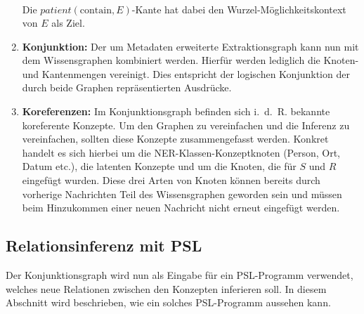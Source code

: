 \begin{enumerate}
\begin{align*}
		\end{align*}
		Die $patient(\text{contain}, E)$-Kante hat dabei den Wurzel-Möglichkeitskontext von $E$ als Ziel.
	\item \textbf{Konjunktion:}
		Der um Metadaten erweiterte Extraktionsgraph kann nun mit dem Wissensgraphen kombiniert werden.
		Hierfür werden lediglich die Knoten- und Kantenmengen vereinigt.
		Dies entspricht der logischen Konjunktion der durch beide Graphen repräsentierten Ausdrücke.
	\item \textbf{Koreferenzen:}
		Im Konjunktionsgraph befinden sich i.~d.~R. bekannte koreferente Konzepte.
		Um den Graphen zu vereinfachen und die Inferenz zu vereinfachen, sollten diese Konzepte zusammengefasst werden.
		Konkret handelt es sich hierbei um die NER-Klassen-Konzeptknoten (Person, Ort, Datum etc.), die latenten Konzepte und um die Knoten, die für $S$ und $R$ eingefügt wurden.
		Diese drei Arten von Knoten können bereits durch vorherige Nachrichten Teil des Wissensgraphen geworden sein und müssen beim Hinzukommen einer neuen Nachricht nicht erneut eingefügt werden.
\end{enumerate}

\subsection{Relationsinferenz mit PSL}%
\label{sec:text2kg:psl:inference}

Der Konjunktionsgraph wird nun als Eingabe für ein PSL-Programm verwendet, welches neue Relationen zwischen den Konzepten inferieren soll.
In diesem Abschnitt wird beschrieben, wie ein solches PSL-Programm aussehen kann.

